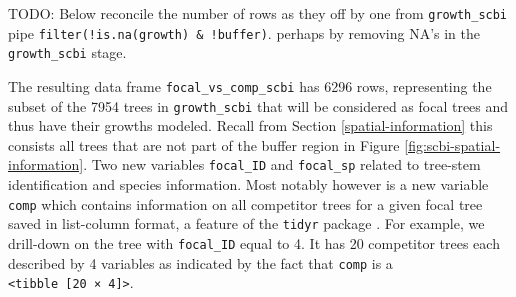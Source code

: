 \documentclass[12pt]{article}
\newenvironment{Shaded}{\begin{snugshade}}{\end{snugshade}}
\newcommand{\CommentTok}[1]{\textcolor[rgb]{0.56,0.35,0.01}{\textit{#1}}}
\newcommand{\DataTypeTok}[1]{\textcolor[rgb]{0.13,0.29,0.53}{#1}}
\newcommand{\DecValTok}[1]{\textcolor[rgb]{0.00,0.00,0.81}{#1}}
\newcommand{\KeywordTok}[1]{\textcolor[rgb]{0.13,0.29,0.53}{\textbf{#1}}}
\newcommand{\NormalTok}[1]{#1}
\newcommand{\OperatorTok}[1]{\textcolor[rgb]{0.81,0.36,0.00}{\textbf{#1}}}
\newcommand{\StringTok}[1]{\textcolor[rgb]{0.31,0.60,0.02}{#1}}
\begin{document}
\begin{Shaded}
\end{Shaded}

TODO: Below reconcile the number of rows as they off by one from
\texttt{growth\_scbi} pipe \texttt{filter(!is.na(growth)\ \&\ !buffer)}.
perhaps by removing NA's in the \texttt{growth\_scbi} stage.

The resulting data frame \texttt{focal\_vs\_comp\_scbi} has 6296 rows,
representing the subset of the 7954 trees in \texttt{growth\_scbi} that
will be considered as focal trees and thus have their growths modeled.
Recall from Section \ref{spatial-information} this consists all trees
that are not part of the buffer region in Figure
\ref{fig:scbi-spatial-information}. Two new variables \texttt{focal\_ID}
and \texttt{focal\_sp} related to tree-stem identification and species
information. Most notably however is a new variable \texttt{comp} which
contains information on all competitor trees for a given focal tree
saved in list-column format, a feature of the \texttt{tidyr} package
\citet{tidyr_package}. For example, we drill-down on the tree with
\texttt{focal\_ID} equal to 4. It has 20 competitor trees each described
by 4 variables as indicated by the fact that \texttt{comp} is a
\texttt{\textless{}tibble\ {[}20\ ×\ 4{]}\textgreater{}}.

\begin{Shaded}
\end{Shaded}
\end{document}

